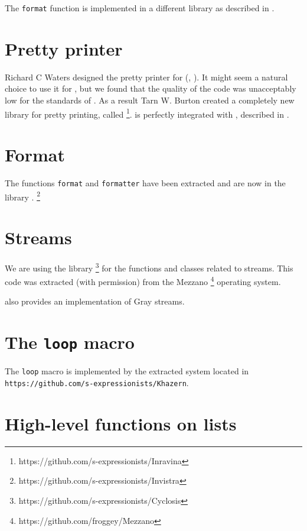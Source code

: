The \texttt{format} function is implemented in a different library as
described in .

\section{Pretty printer}
\label{sec-pretty-printer}

Richard C Waters designed the pretty printer for
\commonlisp{} (\cite{Waters89xp:a}, \cite{Waters:1992:UNC:1039991.1039996}).
It might seem a natural choice to use it for \sysname{}, but we found
that the quality of the code was unacceptably low for the standards of
\sysname{}.  As a result Tarn W. Burton created a completely new
library for pretty printing, called \inravina{}%
\footnote{https://github.com/s-expressionists/Inravina}.  \inravina{}
is perfectly integrated with \incless{}, described in
.

\section{Format}
\label{sec-format}

The functions \texttt{format} and \texttt{formatter} have been
extracted and are now in the library \invistra{}.
\footnote{https://github.com/s-expressionists/Invistra}

\section{Streams}
\label{sec-streams}

We are using the \cyclosis{} library%
\footnote{https://github.com/s-expressionists/Cyclosis} for the
\commonlisp{} functions and classes related to streams.  This code was
extracted (with permission) from the Mezzano%
\footnote{https://github.com/froggey/Mezzano}
operating system.

\cyclosis{} also provides an implementation of Gray streams.

\section{The \texttt{loop} macro} 
\label{sec-loop}

The \texttt{loop} macro is implemented by the extracted system
\khazern{} located in
\texttt{https://github.com/s-expressionists/Khazern}.

\section{High-level functions on lists}
\label{sec-constrictor}

